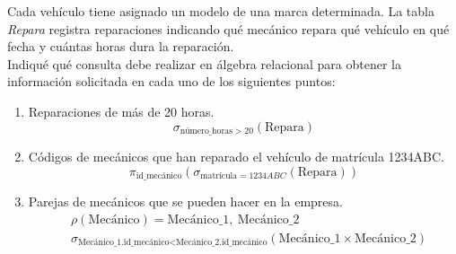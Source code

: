 \begin{ejercicio}
    Cada vehículo tiene asignado un modelo de una marca determinada. La tabla \emph{Repara} registra reparaciones indicando qué mecánico repara qué vehículo en qué fecha y cuántas horas dura la reparación.\\

    Indiqué qué consulta debe realizar en álgebra relacional para obtener la información solicitada en cada uno de los siguientes puntos:
    \begin{enumerate}
        \item Reparaciones de más de 20 horas.
        \begin{equation*}
            \sigma_{\text{número\_horas} > 20}(\text{Repara})
        \end{equation*}
        \item Códigos de mecánicos que han reparado el vehículo de matrícula 1234ABC.
        \begin{equation*}
            \pi_{\text{id\_mecánico}}(\sigma_{\text{matrícula} = 1234ABC}(\text{Repara}))
        \end{equation*}
        \item Parejas de mecánicos que se pueden hacer en la empresa.
        \begin{align*}
            &\rho(\text{Mecánico})=\text{Mecánico\_1},~\text{Mecánico\_2} \\
            &\sigma_{\text{Mecánico\_1.id\_mecánico}< \text{Mecánico\_2.id\_mecánico}}(\text{Mecánico\_1}\times \text{Mecánico\_2})
        \end{align*}


\end{enumerate}
\end{ejercicio}
